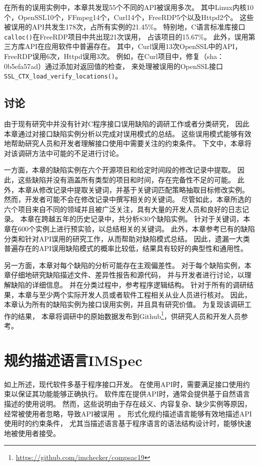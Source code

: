 在所有的误用实例中，本章共发现55个不同的API被误用多次。
其中Linux内核10个，OpenSSL10个，FFmpeg14个，Curl14个，FreeRDP5个以及Httpd2个。
这些被误用的API共发生178次，占所有实例的21.45\%。
特别地，C语言标准库接口\texttt{calloc()}在FreeRDP项目中共出现21次误用，
占该项目的15.67\%。
此外，误用第三方库API在应用软件中普遍存在。
其中，Curl误用13次OpenSSL中的API，FreeRDP误用6次，Httpd误用3次。
例如，在Curl项目中，修复（sha：0b5efa57ad）通过添加对返回值的检查，
来处理被误用的OpenSSL接口
\texttt{SSL\_CTX\_load\_verify\_locations()}。


\subsection{讨论}
由于现有研究中并没有针对C程序接口误用缺陷的调研工作或者分类研究，
因此本章通过对接口缺陷实例分析以完成对误用模式的总结。
这些误用模式能够有效地帮助研究人员和开发者理解接口使用中需要关注的约束条件。
下文中，本章将对该调研方法中可能的不足进行讨论。

一方面，本章的缺陷实例在六个开源项目和给定时间段的修改记录中提取。
因此，这些缺陷并没有涵盖所有类型的项目和时间，存在完备性不足的可能。
此外，本章从修改记录中提取关键词，并基于关键词匹配策略抽取目标修改实例。
然而，开发者可能不会在修改记录中撰写相关的关键词。
尽管如此，本章所选的六个项目来自不同的领域并且被广泛关注，具有大量的开发人员和良好的日志记录。
本章在跨越五年的历史记录中，共分析830个缺陷实例。
针对于关键词，本章在600个实例上进行预实验，以总结相关的关键词。
此外，本章参考已有的缺陷分类和针对API误用的研究工作，从而帮助对缺陷模式总结。
因此，遗漏一大类普遍存在的API误用缺陷模式的概率比较低，结果具有较好的典型性和通用性。

另一方面，本章对每个缺陷的分析可能存在主观偏差性。
对于每个缺陷实例，本章仔细地研究缺陷描述文件、差异性报告和源代码，
并与开发者进行讨论，以理解缺陷的详细信息。
并在分类过程中，参考程序逻辑结构。
针对于所有的调研结果，本章与至少两个实际开发人员或者软件工程相关从业人员进行核对。
因此，本章认为所有的缺陷实例为接口误用实例，并且具有研究价值。
为复现该调研工作的结果，
本章将调研中的原始数据发布到Github\footnote{\url{https://github.com/imchecker/compsac19}}，供研究人员和开发人员参考。

\section{规约描述语言IMSpec}
\label{sec:2.4}
如上所述，现代软件多基于程序接口开发。
在使用API时，需要满足接口使用约束以保证其功能能够正确执行。
软件库在提供API时，通常会提供基于自然语言描述的使用说明。
然而，这些说明由于存在歧义、内容复杂、缺少实例等原因，经常被使用者忽略，导致API被误用~\cite{11-etaps-doc}。
形式化规约描述语言能够有效地描述API使用时的约束条件，
尤其当描述语言基于程序语言的语法结构设计时，能够快速地被使用者接受。

